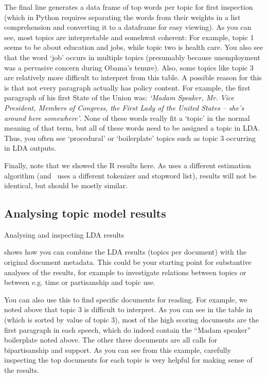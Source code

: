 The final line generates a data frame of top words per topic for first inspection
(which in Python requires separating the words from their weights in a list comprehension and converting it to a dataframe for easy viewing).
As you can see, most topics are interpretable and somehwat coherent: For example, topic 1 seems to be about education and jobs,
while topic two is health care. You also see that the word `job' occurs in multiple topics (presumably because unemployment was a pervasive concern during Obama's tenure).
Also, some topics like topic 3 are relatively more difficult to interpret from this table.
A possible reason for this is that not every paragraph actually has policy content.
For example, the first paragraph of his first State of the Union was:
\emph{`Madam Speaker, Mr. Vice President, Members of Congress, the First Lady of the United States -- she's around here somewhere'}.
None of these words really fit a `topic' in the normal meaning of that term,
but all of these words need to be assigned a topic in LDA.
Thus, you often see `procedural' or `boilerplate' topics such as topic 3 occurring in LDA outputs. 

Finally, note that we showed the R results here. As  uses a different estimation algorithm
(and \sklearn\ uses a different tokenizer and stopword list), results will not be identical,
but should be mostly similar. 

\subsection{Analysing topic model results}

\begin{ccsexample}
\caption{Analysing and inspecting LDA results}\label{ex:ldaresults}
\end{ccsexample}


 shows how you can combine the LDA results (topics per document)
with the original document metadata.
This could be your starting point for substantive analyses of the results,
for example to investigate relations between topics or between e.g. time or partisanship and topic use.

You can also use this to find specific documents for reading.
For example, we noted above that topic 3 is difficult to interpret.
As you can see in the table in  (which is sorted by value of topic 3),
most of the high scoring documents are the first paragraph in each speech,
which do indeed contain the ``Madam speaker'' boilerplate noted above.
The other three documents are all calls for bipartisanship and support.
As you can see from this example, carefully inspecting the top documents for each topic
is very helpful for making sense of the results.


